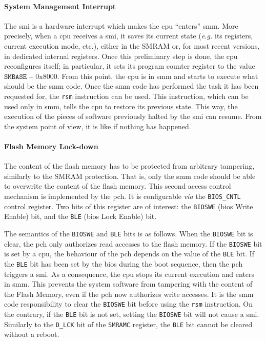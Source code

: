 \paragraph{System Management Interrupt}

The \ac{smi} is a hardware interrupt which makes the \ac{cpu} ``enters''
\ac{smm}. 
%
More precisely, when a \ac{cpu} receives a \ac{smi}, it saves its current state
(\emph{e.g.} its registers, current execution mode, etc.), either in the SMRAM
or, for most recent versions, in dedicated internal registers. 
%
Once this preliminary step is done, the \ac{cpu} reconfigures itself;
%
in particular, it sets its program counter register to the value
$\mathtt{SMBASE} + \mathrm{0x8000}$.
%
From this point, the \ac{cpu} is in \ac{smm} and starts to execute what should
be the \ac{smm} code.
%
Once the \ac{smm} code has performed the task it has been requested for, the
\texttt{rsm} instruction can be used.
%
This instruction, which can be used only in \ac{smm}, tells the \ac{cpu} to
restore its previous state.
%
This way, the execution of the pieces of software previously halted by the
\ac{smi} can resume.
%
From the system point of view, it is like if nothing has happened. 

\paragraph{Flash Memory Lock-down}
%
The content of the flash memory has to be protected from arbitrary tampering,
similarly to the SMRAM protection.
%
That is, only the \ac{smm} code should be able to overwrite the content of the
flash memory.
%
This second access control mechanism is implemented by the \ac{pch}.
%
It is configurable \emph{via} the \texttt{BIOS\_CNTL} control register.
%
Two bits of this register are of interest: the \texttt{BIOSWE} (\ac{bios} Write
Enable) bit, and the \texttt{BLE} (\ac{bios} Lock Enable) bit.

The semantics of the \texttt{BIOSWE} and \texttt{BLE} bits is as follows.
%
When the \texttt{BIOSWE} bit is clear, the \ac{pch} only authorizes read
accesses to the flash memory.
%
If the \texttt{BIOSWE} bit is set by a \ac{cpu}, the behaviour of the \ac{pch}
depends on the value of the \texttt{BLE} bit.
%
If the \texttt{BLE} bit has been set by the \ac{bios} during the boot sequence,
then the \ac{pch} triggers a \ac{smi}.
%
As a consequence, the \ac{cpu} stops its current execution and enters in
\ac{smm}.
%
This prevents the system software from tampering with the content of the Flash
Memory, even if the \ac{pch} now authorizes write accesses.
%
It is the \ac{smm} code responsibility to clear the \texttt{BIOSWE} bit before
using the \texttt{rsm} instruction.
%
On the contrary, if the \texttt{BLE} bit is not set, setting the \texttt{BIOSWE}
bit will not cause a \ac{smi}.
%
Similarly to the \texttt{D\_LCK} bit of the \texttt{SMRAMC} register, the
\texttt{BLE} bit cannot be cleared without a reboot.

